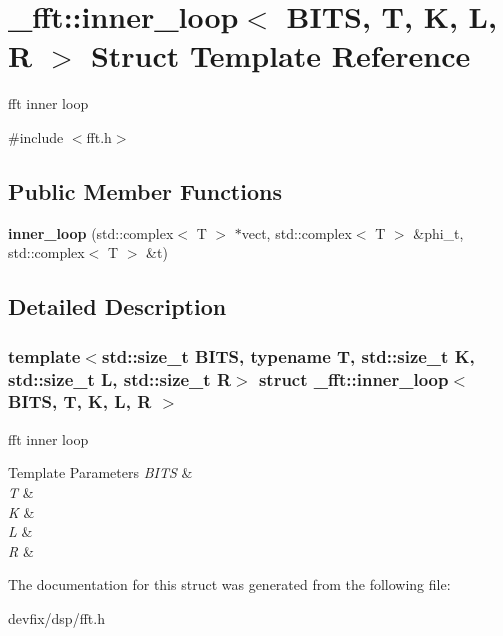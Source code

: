 \hypertarget{struct__fft_1_1inner__loop}{}\section{\+\_\+fft\+:\+:inner\+\_\+loop$<$ B\+I\+TS, T, K, L, R $>$ Struct Template Reference}
\label{struct__fft_1_1inner__loop}


fft inner loop  




{\ttfamily \#include $<$fft.\+h$>$}

\subsection*{Public Member Functions}
\begin{DoxyCompactItemize}
\item 
\mbox{\label{struct__fft_1_1inner__loop_a24d9bcda13d11b9f68d7156360c252c6}} 
{\bfseries inner\+\_\+loop} (std\+::complex$<$ T $>$ $\ast$vect, std\+::complex$<$ T $>$ \&phi\+\_\+t, std\+::complex$<$ T $>$ \&t)
\end{DoxyCompactItemize}


\subsection{Detailed Description}
\subsubsection*{template$<$std\+::size\+\_\+t B\+I\+TS, typename T, std\+::size\+\_\+t K, std\+::size\+\_\+t L, std\+::size\+\_\+t R$>$\newline
struct \+\_\+fft\+::inner\+\_\+loop$<$ B\+I\+T\+S, T, K, L, R $>$}

fft inner loop 


\begin{DoxyTemplParams}{Template Parameters}
{\em B\+I\+TS} & \\
\hline
{\em T} & \\
\hline
{\em K} & \\
\hline
{\em L} & \\
\hline
{\em R} & \\
\hline
\end{DoxyTemplParams}


The documentation for this struct was generated from the following file\+:\begin{DoxyCompactItemize}
\item 
devfix/dsp/fft.\+h\end{DoxyCompactItemize}
